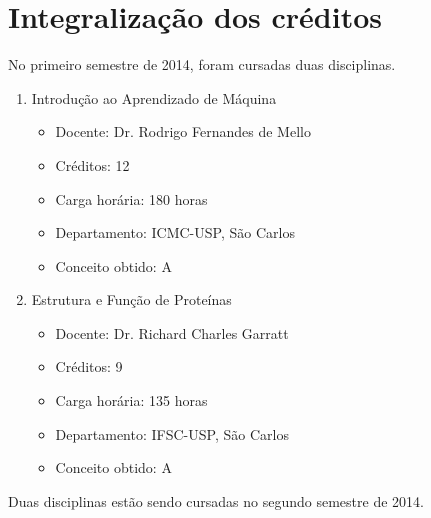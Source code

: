 \chapter{Integralização dos créditos}\label{ch:introducao}

No primeiro semestre de 2014, foram cursadas duas disciplinas.



\begin{enumerate}
	\item Introdução ao Aprendizado de Máquina
	\begin{itemize}
		\item Docente: Dr. Rodrigo Fernandes de Mello
		\item Créditos: 12
		\item Carga horária: 180 horas
		\item Departamento: ICMC-USP, São Carlos
		\item Conceito obtido: A
	\end{itemize}
	\item Estrutura e Função de Proteínas
	\begin{itemize}
		\item Docente: Dr. Richard Charles Garratt
		\item Créditos: 9
		\item Carga horária: 135 horas
		\item Departamento: IFSC-USP, São Carlos
		\item Conceito obtido: A
	\end{itemize}
\end{enumerate}

Duas disciplinas estão sendo cursadas no segundo semestre de 2014.

